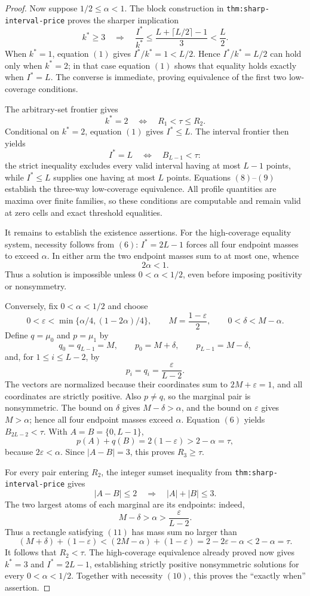 \documentclass{article}
\begin{document}
\begin{proof}
Now suppose \(1/2\leq\alpha<1\).  The block construction in \texttt{thm:sharp-interval-price} proves the sharper implication
\[
k^*\geq3
\quad\Longrightarrow\quad
\frac{I^*}{k^*}
\leq\frac{L+\lceil L/2\rceil-1}{3}
<\frac L2.
\tag{7}
\]
When \(k^*=1\), equation \((1)\) gives \(I^*/k^*=1<L/2\).  Hence \(I^*/k^*=L/2\) can hold only when \(k^*=2\); in that case equation \((1)\) shows that equality holds exactly when \(I^*=L\).  The converse is immediate, proving equivalence of the first two low-coverage conditions.

The arbitrary-set frontier gives
\[
k^*=2
\quad\Longleftrightarrow\quad
R_1<\tau\leq R_2.
\tag{8}
\]
Conditional on \(k^*=2\), equation \((1)\) gives \(I^*\leq L\).  The interval frontier then yields
\[
I^*=L
\quad\Longleftrightarrow\quad
B_{L-1}<\tau:
\tag{9}
\]
the strict inequality excludes every valid interval having at most \(L-1\) points, while \(I^*\leq L\) supplies one having at most \(L\) points.  Equations \((8)\)--\((9)\) establish the three-way low-coverage equivalence.  All profile quantities are maxima over finite families, so these conditions are computable and remain valid at zero cells and exact threshold equalities.

It remains to establish the existence assertions.  For the high-coverage equality system, necessity follows from \((6)\): \(I^*=2L-1\) forces all four endpoint masses to exceed \(\alpha\).  In either arm the two endpoint masses sum to at most one, whence
\[
2\alpha<1.
\tag{10}
\]
Thus a solution is impossible unless \(0<\alpha<1/2\), even before imposing positivity or nonsymmetry.

Conversely, fix \(0<\alpha<1/2\) and choose
\[
0<\varepsilon<\min\{\alpha/4,(1-2\alpha)/4\},
\qquad
M=\frac{1-\varepsilon}{2},
\qquad
0<\delta<M-\alpha.
\]
Define \(q=\mu_0\) and \(p=\mu_1\) by
\[
q_0=q_{L-1}=M,
\qquad
p_0=M+\delta,
\qquad
p_{L-1}=M-\delta,
\]
and, for \(1\leq i\leq L-2\), by
\[
p_i=q_i=\frac{\varepsilon}{L-2}.
\]
The vectors are normalized because their coordinates sum to \(2M+\varepsilon=1\), and all coordinates are strictly positive.  Also \(p\neq q\), so the marginal pair is nonsymmetric.  The bound on \(\delta\) gives \(M-\delta>\alpha\), and the bound on \(\varepsilon\) gives \(M>\alpha\); hence all four endpoint masses exceed \(\alpha\).  Equation \((6)\) yields \(B_{2L-2}<\tau\).  With \(A=B=\{0,L-1\}\),
\[
p(A)+q(B)=2(1-\varepsilon)>2-\alpha=\tau,
\]
because \(2\varepsilon<\alpha\).  Since \(|A-B|=3\), this proves \(R_3\geq\tau\).

For every pair entering \(R_2\), the integer sumset inequality from \texttt{thm:sharp-interval-price} gives
\[
|A-B|\leq2
\quad\Longrightarrow\quad
|A|+|B|\leq3.
\tag{11}
\]
The two largest atoms of each marginal are its endpoints: indeed,
\[
M-\delta>\alpha>\frac{\varepsilon}{L-2}.
\]
Thus a rectangle satisfying \((11)\) has mass sum no larger than
\[
(M+\delta)+(1-\varepsilon)
<(2M-\alpha)+(1-\varepsilon)
=2-2\varepsilon-\alpha
<2-\alpha=\tau.
\tag{12}
\]
It follows that \(R_2<\tau\).  The high-coverage equivalence already proved now gives \(k^*=3\) and \(I^*=2L-1\), establishing strictly positive nonsymmetric solutions for every \(0<\alpha<1/2\).  Together with necessity \((10)\), this proves the ``exactly when'' assertion.


\end{proof}
\end{document}

